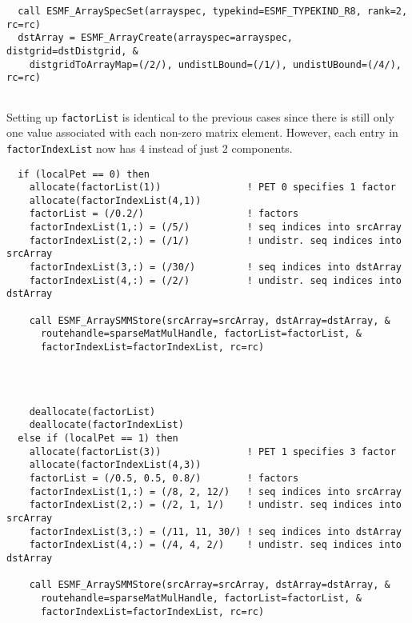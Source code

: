 
 \begin{verbatim}
  call ESMF_ArraySpecSet(arrayspec, typekind=ESMF_TYPEKIND_R8, rank=2, rc=rc)
  dstArray = ESMF_ArrayCreate(arrayspec=arrayspec, distgrid=dstDistgrid, &
    distgridToArrayMap=(/2/), undistLBound=(/1/), undistUBound=(/4/), rc=rc)
 
\end{verbatim}
 

   Setting up {\tt factorList} is identical to the previous cases since there is
   still only one value associated with each non-zero matrix element. However,
   each entry in {\tt factorIndexList} now has 4 instead of just 2 components. 

 \begin{verbatim}
  if (localPet == 0) then
    allocate(factorList(1))               ! PET 0 specifies 1 factor
    allocate(factorIndexList(4,1))
    factorList = (/0.2/)                  ! factors
    factorIndexList(1,:) = (/5/)          ! seq indices into srcArray
    factorIndexList(2,:) = (/1/)          ! undistr. seq indices into srcArray
    factorIndexList(3,:) = (/30/)         ! seq indices into dstArray
    factorIndexList(4,:) = (/2/)          ! undistr. seq indices into dstArray
    
    call ESMF_ArraySMMStore(srcArray=srcArray, dstArray=dstArray, &
      routehandle=sparseMatMulHandle, factorList=factorList, &
      factorIndexList=factorIndexList, rc=rc)
 
\end{verbatim}
 

 \begin{verbatim}

      
    deallocate(factorList)
    deallocate(factorIndexList)
  else if (localPet == 1) then
    allocate(factorList(3))               ! PET 1 specifies 3 factor
    allocate(factorIndexList(4,3))
    factorList = (/0.5, 0.5, 0.8/)        ! factors
    factorIndexList(1,:) = (/8, 2, 12/)   ! seq indices into srcArray
    factorIndexList(2,:) = (/2, 1, 1/)    ! undistr. seq indices into srcArray
    factorIndexList(3,:) = (/11, 11, 30/) ! seq indices into dstArray
    factorIndexList(4,:) = (/4, 4, 2/)    ! undistr. seq indices into dstArray
    
    call ESMF_ArraySMMStore(srcArray=srcArray, dstArray=dstArray, &
      routehandle=sparseMatMulHandle, factorList=factorList, &
      factorIndexList=factorIndexList, rc=rc)
 
\end{verbatim}
 
